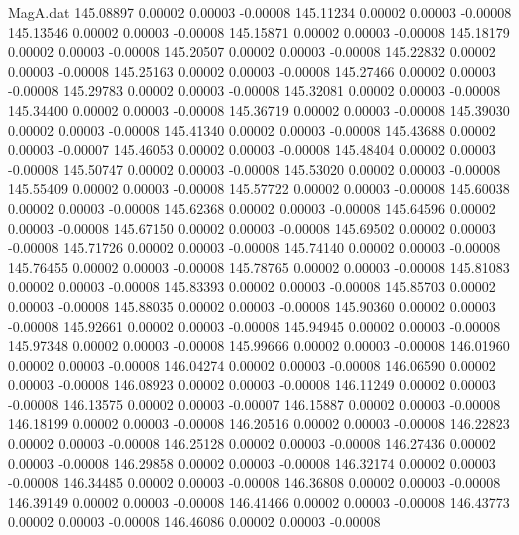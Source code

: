 \begin{filecontents}{MagA.dat}
 145.08897    0.00002    0.00003   -0.00008
 145.11234    0.00002    0.00003   -0.00008
 145.13546    0.00002    0.00003   -0.00008
 145.15871    0.00002    0.00003   -0.00008
 145.18179    0.00002    0.00003   -0.00008
 145.20507    0.00002    0.00003   -0.00008
 145.22832    0.00002    0.00003   -0.00008
 145.25163    0.00002    0.00003   -0.00008
 145.27466    0.00002    0.00003   -0.00008
 145.29783    0.00002    0.00003   -0.00008
 145.32081    0.00002    0.00003   -0.00008
 145.34400    0.00002    0.00003   -0.00008
 145.36719    0.00002    0.00003   -0.00008
 145.39030    0.00002    0.00003   -0.00008
 145.41340    0.00002    0.00003   -0.00008
 145.43688    0.00002    0.00003   -0.00007
 145.46053    0.00002    0.00003   -0.00008
 145.48404    0.00002    0.00003   -0.00008
 145.50747    0.00002    0.00003   -0.00008
 145.53020    0.00002    0.00003   -0.00008
 145.55409    0.00002    0.00003   -0.00008
 145.57722    0.00002    0.00003   -0.00008
 145.60038    0.00002    0.00003   -0.00008
 145.62368    0.00002    0.00003   -0.00008
 145.64596    0.00002    0.00003   -0.00008
 145.67150    0.00002    0.00003   -0.00008
 145.69502    0.00002    0.00003   -0.00008
 145.71726    0.00002    0.00003   -0.00008
 145.74140    0.00002    0.00003   -0.00008
 145.76455    0.00002    0.00003   -0.00008
 145.78765    0.00002    0.00003   -0.00008
 145.81083    0.00002    0.00003   -0.00008
 145.83393    0.00002    0.00003   -0.00008
 145.85703    0.00002    0.00003   -0.00008
 145.88035    0.00002    0.00003   -0.00008
 145.90360    0.00002    0.00003   -0.00008
 145.92661    0.00002    0.00003   -0.00008
 145.94945    0.00002    0.00003   -0.00008
 145.97348    0.00002    0.00003   -0.00008
 145.99666    0.00002    0.00003   -0.00008
 146.01960    0.00002    0.00003   -0.00008
 146.04274    0.00002    0.00003   -0.00008
 146.06590    0.00002    0.00003   -0.00008
 146.08923    0.00002    0.00003   -0.00008
 146.11249    0.00002    0.00003   -0.00008
 146.13575    0.00002    0.00003   -0.00007
 146.15887    0.00002    0.00003   -0.00008
 146.18199    0.00002    0.00003   -0.00008
 146.20516    0.00002    0.00003   -0.00008
 146.22823    0.00002    0.00003   -0.00008
 146.25128    0.00002    0.00003   -0.00008
 146.27436    0.00002    0.00003   -0.00008
 146.29858    0.00002    0.00003   -0.00008
 146.32174    0.00002    0.00003   -0.00008
 146.34485    0.00002    0.00003   -0.00008
 146.36808    0.00002    0.00003   -0.00008
 146.39149    0.00002    0.00003   -0.00008
 146.41466    0.00002    0.00003   -0.00008
 146.43773    0.00002    0.00003   -0.00008
 146.46086    0.00002    0.00003   -0.00008

\end{filecontents}
